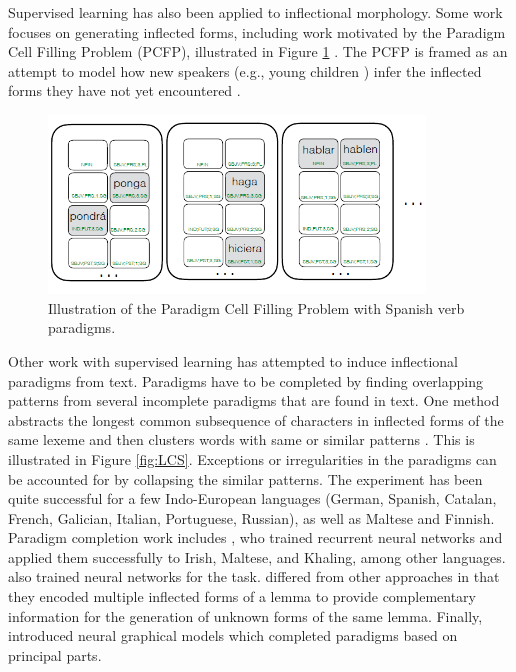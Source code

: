 Supervised learning has also been applied to inflectional morphology. Some work focuses on generating inflected forms, including work motivated by the Paradigm Cell Filling Problem (PCFP), illustrated in Figure \ref{fig:PCFP} \citep{ackerman2009}. The PCFP is framed as an attempt to model how new speakers (e.g., young children
) infer the inflected forms they have not yet encountered \citep{dreyer_discovering_2011,ahlberg_paradigm_2015,malouf_generating_2016,silfverberg_encoder-decoder_2018}. 


\begin{figure}[tb]
\begin{center}
\includegraphics[width=10cm]{figs/PCFP.PNG}
\caption[Paradigm Cell Filling Problem]{Illustration of the Paradigm Cell Filling Problem \citep{silfverberg_encoder-decoder_2018} with Spanish verb paradigms.}
\label{fig:PCFP}
\end{center}
\end{figure}


Other work with supervised learning has attempted to induce inflectional paradigms from text. Paradigms have to be completed by finding overlapping patterns from several incomplete paradigms that are found in text. One method abstracts the longest common subsequence of characters in inflected forms of the same lexeme and then clusters words with same or similar patterns  \citep{ahlberg_semi-supervised_2014,ahlberg_paradigm_2015}. This is illustrated in Figure \ref{fig:LCS}. Exceptions or irregularities in the paradigms can be accounted for by collapsing the similar patterns. The experiment has been quite successful for a few Indo-European languages (German, Spanish, Catalan, French, Galician, Italian, Portuguese, Russian), as well as Maltese and Finnish. Paradigm completion work includes
\citet{malouf_generating_2016}, who trained recurrent neural networks and applied them successfully to Irish, Maltese, and Khaling, among other languages.
\citet{silfverberg_encoder-decoder_2018} also trained neural networks for the task.  \citet{kann-etal-2017-neural} differed from other approaches in that they encoded multiple inflected forms of a lemma to provide complementary information for the generation of unknown forms of the same lemma.
Finally, \citet{cotterell-etal-2017-neural} introduced neural graphical models which completed paradigms based on principal parts.

